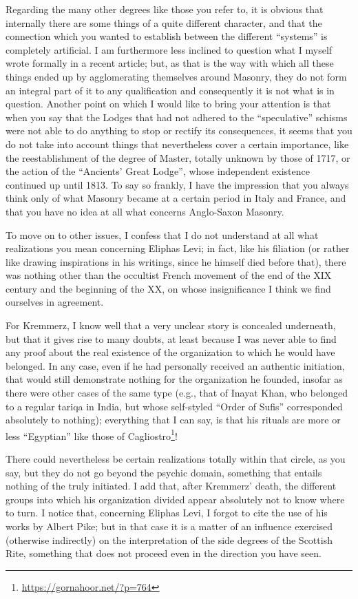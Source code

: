 Regarding the many other degrees like those you refer to, it is obvious that internally there are some things of a quite different character, and that the connection which you wanted to establish between the different ``systems'' is completely artificial. I am furthermore less inclined to question what I myself wrote formally in a recent article; but, as that is the way with which all these things ended up by agglomerating themselves around Masonry, they do not form an integral part of it to any qualification and consequently it is not what is in question. Another point on which I would like to bring your attention is that when you say that the Lodges that had not adhered to the ``speculative'' schisms were not able to do anything to stop or rectify its consequences, it seems that you do not take into account things that nevertheless cover a certain importance, like the reestablishment of the degree of Master, totally unknown by those of 1717, or the action of the ``Ancients' Great Lodge'', whose independent existence continued up until 1813. To say so frankly, I have the impression that you always think only of what Masonry became at a certain period in Italy and France, and that you have no idea at all what concerns Anglo-Saxon Masonry.

To move on to other issues, I confess that I do not understand at all what realizations you mean concerning Eliphas Levi; in fact, like his filiation (or rather like drawing inspirations in his writings, since he himself died before that), there was nothing other than the occultist French movement of the end of the XIX century and the beginning of the XX, on whose insignificance I think we find ourselves in agreement.

For Kremmerz, I know well that a very unclear story is concealed underneath, but that it gives rise to many doubts, at least because I was never able to find any proof about the real existence of the organization to which he would have belonged. In any case, even if he had personally received an authentic initiation, that would still demonstrate nothing for the organization he founded, insofar as there were other cases of the same type (e.g., that of Inayat Khan, who belonged to a regular tariqa in India, but whose self-styled ``Order of Sufis'' corresponded absolutely to nothing); everything that I can say, is that his rituals are more or less ``Egyptian'' like those of Cagliostro\footnote{\url{https://gornahoor.net/?p=764}}!

There could nevertheless be certain realizations totally within that circle, as you say, but they do not go beyond the psychic domain, something that entails nothing of the truly initiated. I add that, after Kremmerz' death, the different groups into which his organization divided appear absolutely not to know where to turn. I notice that, concerning Eliphas Levi, I forgot to cite the use of his works by Albert Pike; but in that case it is a matter of an influence exercised (otherwise indirectly) on the interpretation of the side degrees of the Scottish Rite, something that does not proceed even in the direction you have seen.

